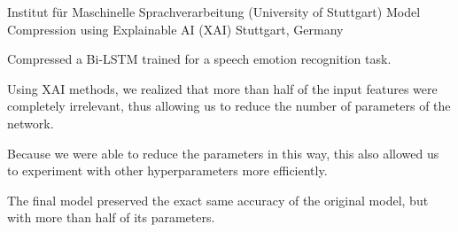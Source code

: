 

\begin{cventries}

  \cventry
    {Institut für Maschinelle Sprachverarbeitung (University of Stuttgart)} %
    {Model Compression using Explainable AI (XAI)} %
    {Stuttgart, Germany} %
    {} %
    {
      \begin{cvitems} %
        \item {Compressed a Bi-LSTM trained for a speech emotion recognition task.}
		\item {Using XAI methods, we realized that more than half of the input features were completely irrelevant, thus allowing us to reduce the number of parameters of the network.}
		\item {Because we were able to reduce the parameters in this way, this also allowed us to experiment with other hyperparameters more efficiently.}
		\item {The final model preserved the exact same accuracy of the original model, but with more than half of its parameters.}
      \end{cvitems}
    }

\end{cventries}

